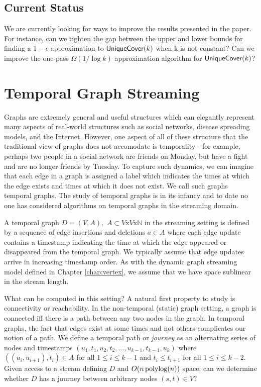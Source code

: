 \subsection*{Current Status}
We are currently looking for ways to improve the results presented in the paper.  For instance, can we tighten the gap between the upper and lower bounds for finding a  $1-\epsilon$ approximation to $\uc(k)$ when k is not constant?  Can we improve the one-pass $\Omega(1/\log k)$ approximation algorithm for $\uc(k)$?


\section{Temporal Graph Streaming}
\label{sec:tempgraph}

Graphs are extremely general and useful structures which can elegantly represent many aspects of real-world structures such as social networks, disease spreading models, and the Internet. However, one aspect of all of these structure that the traditional view of graphs does not accomodate is temporality - for example, perhaps two people in a social network are friends on Monday, but have a fight and are no longer friends by Tuesday.  To capture such dynamics, we can imagine that each edge in a graph is assigned a label which indicates the times at which the edge exists and times at which it does not exist.  We call such graphs temporal graphs.  The study of temporal graphs is in its infancy \cite{temporalsurvey} and to date no one has considered algorithms on temporal graphs in the streaming domain.

A temporal graph $D = (V, A),$ $A \subset V$x$V$x$\mathbb{N}$ in the streaming setting is defined by a sequence of edge insertions and deletions $a \in A$ where each edge update contains a timestamp indicating the time at which the edge appeared or disappeared from the temporal graph.  We typically assume that edge updates arrive in increasing timestamp order.  As with the dynamic graph streaming model defined in Chapter \ref{chap:vertex}, we assume that we have space sublinear in the stream length.

What can be computed in this setting?  A natural first property to study is connectivity or reachability.  In the non-temporal (static) graph setting, a graph is connected iff there is a path between any two nodes in the graph.  In temporal graphs, the fact that edges exist at some times and not others complicates our notion of a path.  We define a temporal path or \emph{journey}  as an alternating series of nodes and timestamps $(u_1, t_1, u_2, t_2, \dots, u_{k-1}, t_{k-1}, u_k)$ where $((u_i, u_{i+1}),t_i) \in A$ for all $ 1 \leq i \leq k-1$ and $t_i \leq t_{i+1}$ for all $1 \leq i \leq k-2$.  Given access to a stream defining $D$ and $O(n \operatorname{polylog}(n))$ space, can we determine whether $D$ has a journey between arbitrary nodes $(s,t) \in V$?

